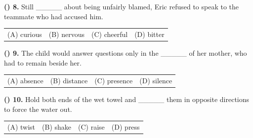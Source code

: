 \documentclass[11pt,a4paper]{article}
\newenvironment{qblock}{\par\vspace{3pt}\noindent\begin{minipage}{\linewidth}}{\end{minipage}\par\vspace{4pt}}
\begin{document}
\begin{qblock}
\textbf{(\hspace{0.6cm}) 8.} Still \_\_\_\_\_ about being unfairly blamed, Eric refused to speak to the teammate who had accused him.
\par
\begin{tabularx}{\linewidth}{@{}XXXX@{}}
(A) curious & (B) nervous & (C) cheerful & (D) bitter
\end{tabularx}
\end{qblock}
\begin{qblock}
\textbf{(\hspace{0.6cm}) 9.} The child would answer questions only in the \_\_\_\_\_ of her mother, who had to remain beside her.
\par
\begin{tabularx}{\linewidth}{@{}XXXX@{}}
(A) absence & (B) distance & (C) presence & (D) silence
\end{tabularx}
\end{qblock}
\begin{qblock}
\textbf{(\hspace{0.6cm}) 10.} Hold both ends of the wet towel and \_\_\_\_\_ them in opposite directions to force the water out.
\par
\begin{tabularx}{\linewidth}{@{}XXXX@{}}
(A) twist & (B) shake & (C) raise & (D) press
\end{tabularx}
\end{qblock}

\newpage
\end{document}

